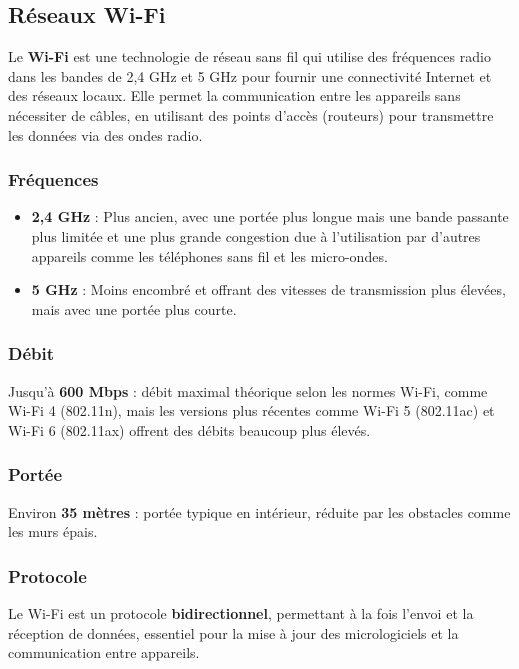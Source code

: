 \subsection{Réseaux Wi-Fi }
Le \textbf{Wi-Fi} est une technologie de réseau sans fil qui utilise des fréquences radio dans les bandes de 2,4 GHz et 5 GHz pour fournir une connectivité Internet et des réseaux locaux. Elle permet la communication entre les appareils sans nécessiter de câbles, en utilisant des points d'accès (routeurs) pour transmettre les données via des ondes radio.

\subsubsection*{Fréquences}
\begin{itemize}
	\item \textbf{2,4 GHz} : Plus ancien, avec une portée plus longue mais une bande passante plus limitée et une plus grande congestion due à l'utilisation par d'autres appareils comme les téléphones sans fil et les micro-ondes.
	\item \textbf{5 GHz} : Moins encombré et offrant des vitesses de transmission plus élevées, mais avec une portée plus courte.
\end{itemize}

\subsubsection*{Débit}
Jusqu'à \textbf{600 Mbps} : débit maximal théorique selon les normes Wi-Fi, comme Wi-Fi 4 (802.11n), mais les versions plus récentes comme Wi-Fi 5 (802.11ac) et Wi-Fi 6 (802.11ax) offrent des débits beaucoup plus élevés.

\subsubsection*{Portée}
Environ \textbf{35 mètres} : portée typique en intérieur, réduite par les obstacles comme les murs épais.

\subsubsection*{Protocole}
Le Wi-Fi est un protocole \textbf{bidirectionnel}, permettant à la fois l'envoi et la réception de données, essentiel pour la mise à jour des micrologiciels et la communication entre appareils.
